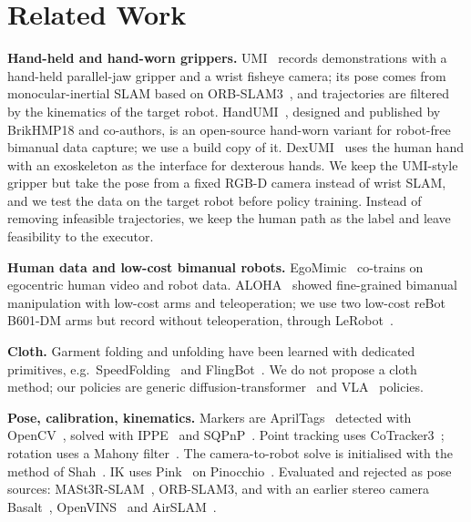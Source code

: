 \documentclass[conference,10pt]{IEEEtran}
\begin{document}
\section{Related Work}\label{sec:related}
\textbf{Hand-held and hand-worn grippers.} UMI~\cite{chi2024umi} records demonstrations with a hand-held parallel-jaw
gripper and a wrist fisheye camera; its pose comes from monocular-inertial SLAM based on
ORB-SLAM3~\cite{campos2021orbslam3}, and trajectories are filtered by the kinematics of the target robot.
HandUMI~\cite{handumi,meza2026handumi}, designed and published by BrikHMP18 and co-authors, is an open-source hand-worn
variant for robot-free bimanual data capture; we use a build copy of it. DexUMI~\cite{xu2025dexumi} uses the human hand
with an exoskeleton as the interface for dexterous hands. We keep the UMI-style gripper but take the pose from a fixed
RGB-D camera instead of wrist SLAM, and we test the data on the target robot before policy training. Instead of
removing infeasible trajectories, we keep the human path as the label and leave feasibility to the executor.

\textbf{Human data and low-cost bimanual robots.} EgoMimic~\cite{kareer2025egomimic} co-trains on egocentric human video
and robot data. ALOHA~\cite{zhao2023aloha} showed fine-grained bimanual manipulation with low-cost arms and teleoperation;
we use two low-cost reBot B601-DM arms but record without teleoperation, through LeRobot~\cite{cadene2024lerobot}.

\textbf{Cloth.} Garment folding and unfolding have been learned with dedicated primitives, e.g.\
SpeedFolding~\cite{avigal2022speedfolding} and FlingBot~\cite{ha2021flingbot}. We do not propose a cloth method; our
policies are generic diffusion-transformer~\cite{peebles2023dit} and VLA~\cite{xvla} policies.

\textbf{Pose, calibration, kinematics.} Markers are AprilTags~\cite{olson2011apriltag,wang2016apriltag2} detected with
OpenCV~\cite{bradski2000opencv}, solved with IPPE~\cite{collins2014ippe} and SQPnP~\cite{terzakis2020sqpnp}. Point tracking
uses CoTracker3~\cite{karaev2024cotracker3}; rotation uses a Mahony filter~\cite{mahony2008ahrs}. The camera-to-robot
solve is initialised with the method of Shah~\cite{shah2013robotworld}. IK uses Pink~\cite{pink} on
Pinocchio~\cite{carpentier2019pinocchio}. Evaluated and rejected as pose sources: MASt3R-SLAM~\cite{murai2025mast3rslam},
ORB-SLAM3, and with an earlier stereo camera Basalt~\cite{usenko2020basalt}, OpenVINS~\cite{geneva2020openvins} and
AirSLAM~\cite{xu2025airslam}.
\end{document}
